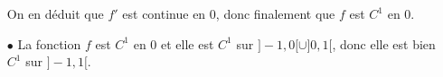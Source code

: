 \documentclass[a4paper, 11pt,reqno]{article}
\begin{document}
\begin{correction}
\begin{itemize}
		      On en d\'eduit que $f'$ est continue en $0$, donc finalement que $f$ est  $C^1$ en 0.
		\item[$\bullet$] La fonction $f$ est $C^1$ en 0 et elle est $C^1$ sur $\rbrack -1,0\lbrack\cup\rbrack 0,1\lbrack$, donc elle est bien $C^1$ sur $\rbrack -1,1\lbrack$.
	\end{itemize}
\end{correction}
\end{document}
